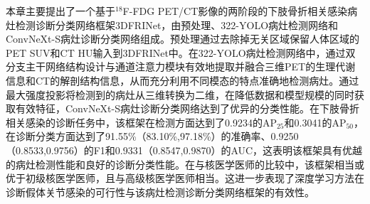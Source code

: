 本章主要提出了一个基于\(^{18}\)F-FDG PET/CT影像的两阶段的下肢骨折相关感染病灶检测诊断分类网络框架3DFRINet，由预处理、322-YOLO病灶检测网络和ConvNeXt-S病灶诊断分类网络组成。预处理通过去除掉无关区域保留人体区域的PET SUV和CT HU输入到3DFRINet中。在322-YOLO病灶检测网络中，通过双分支主干网络结构设计与通道注意力模块有效地提取并融合三维PET的生理代谢信息和CT的解剖结构信息，从而充分利用不同模态的特点准确地检测病灶。通过最大强度投影将检测到的病灶从三维转换为二维，在降低数据和模型规模的同时获取有效特征，ConvNeXt-S病灶诊断分类网络达到了优异的分类性能。在下肢骨折相关感染的诊断任务中，该框架在检测方面达到了0.9234的AP\(_{25}\)和0.3041的AP\(_{50}\)，在诊断分类方面达到了91.55\%（83.10\%,97.18\%）的准确率、0.9250（0.8533,0.9756）的F1和0.9331（0.8547,0.9870）的AUC，这表明该框架具有优越的病灶检测性能和良好的诊断分类性能。在与核医学医师的比较中，该框架相当或优于初级核医学医师，且与高级核医学医师相当。这进一步表现了深度学习方法在诊断假体关节感染的可行性与该病灶检测诊断分类网络框架的有效性。